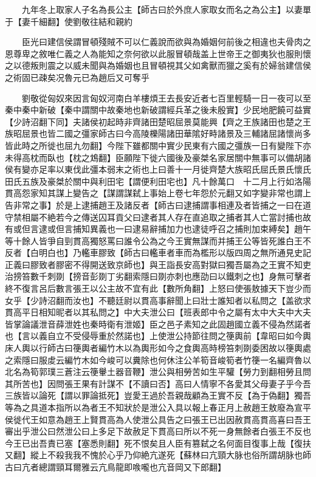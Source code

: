 　　九年冬上取家人子名為長公主【師古曰於外庶人家取女而名之為公主】以妻單于【妻千細翻】使劉敬往結和親約

　　臣光曰建信侯謂冒頓殘賊不可以仁義說而欲與為婚姻何前後之相違也夫骨肉之恩尊卑之敘唯仁義之人為能知之奈何欲以此服冒頓哉盖上世帝王之御夷狄也服則懷之以德叛則震之以威未聞與為婚姻也且冒頓視其父如禽獸而獵之奚有於婦翁建信侯之術固已疎矣况魯元已為趙后又可奪乎

　　劉敬從匈奴來因言匈奴河南白羊樓煩王去長安近者七百里輕騎一日一夜可以至秦中秦中新破【秦中謂關中故秦地也新破謂經兵革之後未殷實】少民地肥饒可益實【少詩沼翻下同】夫諸侯初起時非齊諸田楚昭屈景莫能興【齊之王族諸田也楚之王族昭屈景也皆二國之彊家師古曰今高陵櫟陽諸田華隂好畤諸景及三輔諸屈諸懷尚多皆此時之所徙也屈九勿翻】今陛下雖都關中實少民東有六國之彊族一日有變陛下亦未得高枕而臥也【枕之鴆翻】臣願陛下徙六國後及豪桀名家居關中無事可以備胡諸侯有變亦足率以東伐此彊本弱末之術也上曰善十一月徙齊楚大族昭氏屈氏景氏懷氏田氏五族及豪桀於關中與利田宅【謂便利田宅也】凡十餘萬口　十二月上行如洛陽貫高怨家知其謀上變告之【謀謂謀弑上事始上卷七年怨於元翻又如字變非常也謂上告非常之事】於是上逮捕趙王及諸反者【師古曰逮捕謂事相連及者皆捕之一曰在道守禁相屬不絶若今之傳送囚耳貢父曰逮者其人存在直追取之捕者其人亡當討捕也故有或但言逮或但言捕知異義也一曰逮易辭捕加力也逮徒呼召之捕則加束縛矣】趙午等十餘人皆爭自剄貫高獨怒罵曰誰令公為之今王實無謀而并捕王公等皆死誰白王不反者【白明白也】乃轞車膠致【師古曰轞車者車而為檻形以版四周之無所通見史記正義曰膠致者膠密不得開送致京師也】與王詣長安高對獄曰獨吾屬為之王實不知吏治搒笞數千刺剟【搒音彭剟丁劣翻索隱曰剟亦刺也應劭曰以鐵刺之也】身無可擊者終不復言呂后數言張王以公主故不宜有此【數所角翻】上怒曰使張敖據天下豈少而女乎【少詩沼翻而汝也】不聽廷尉以貫高事辭聞上曰壯士誰知者以私問之【盖欲求貫高平日相知昵者以其私問之】中大夫泄公曰【班表郎中令之屬有太中大夫中大夫皆掌論議泄音薛泄姓也秦時衛有泄姬】臣之邑子素知之此固趙國立義不侵為然諾者也【言以義自立不受侵辱重於然諾也】上使泄公持節往問之箯輿前【韋昭曰如今輿床人輿以行師古曰箯輿者編竹木以為輿形如今之食輿高時榜笞刺剟委困故以箯輿處之索隱曰服䖍云編竹木如今峻可以糞除也何休注公羊筍音峻筍者竹箯一名編齊魯以北名為筍郭璞三蒼注云箯轝土器音鞭】泄公與相勞苦如生平驩【勞力到翻相勞且問其所苦也】因問張王果有計謀不【不讀曰否】高曰人情寧不各愛其父母妻子乎今吾三族皆以論死【謂以罪論抵死】豈愛王過於吾親哉顧為王實不反【為于偽翻】獨吾等為之具道本指所以為者王不知狀於是泄公入具以報上春正月上赦趙王敖廢為宣平侯徙代王如意為趙王上賢貫高為人使泄公具告之曰張王已出因赦貫高貫高喜曰吾王審出乎泄公曰然泄公曰上多足下故赦足下貫高曰所以不死一身無餘者白張王不反也今王已出吾責已塞【塞悉則翻】死不恨矣且人臣有篡弑之名何面目復事上哉【復扶又翻】縱上不殺我我不愧於心乎乃仰絶亢遂死【蘇林曰亢頸大脉也俗所謂胡脉也師古曰亢者總謂頸耳爾雅云亢鳥龍即㗋嚨也亢音岡又下郎翻】

